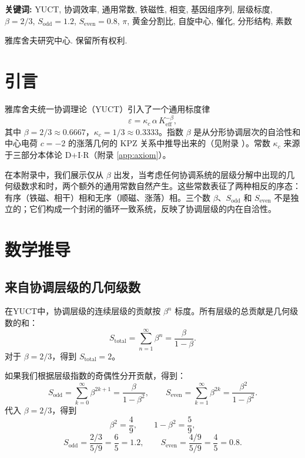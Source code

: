 \documentclass[12pt,a4paper]{article}
\begin{document}
\begin{titlepage}
\begin{center}
			\vspace{1cm}
			\noindent
			\small\textbf{关键词:} YUCT, 协调效率, 通用常数, 铁磁性, 相变, 基因组序列, 层级标度, \(\beta = 2/3\), \(S_{\text{odd}} = 1.2\), \(S_{\text{even}} = 0.8\), \(\pi\), 黄金分割比, 自旋中心, 催化, 分形结构, 素数
			
			\vspace{0.5cm}
			\noindent
			 雅库舍夫研究中心. 保留所有权利.
		\end{center}
	\end{titlepage}
	
	\tableofcontents
	\newpage
	
	\section{引言}
	雅库舍夫统一协调理论（YUCT）引入了一个通用标度律
	\[
	\varepsilon = \kappa_c \, \alpha \, K_{\mathrm{eff}}^{-\beta},
	\]
	其中 \(\beta = 2/3 \approx 0.6667\)，\(\kappa_c = 1/3 \approx 0.3333\)。指数 \(\beta\) 是从分形协调层次的自洽性和中心电荷 \(c = -2\) 的涨落几何的 KPZ 关系中推导出来的（见附录 \cite{AppendixL, AppendixY}）。常数 \(\kappa_c\) 来源于三部分本体论 D+I\(\cdot\)R（附录 \ref{app:axiom}）。
	
	在本附录中，我们展示仅从 \(\beta\) 出发，当考虑任何协调系统的层级分解中出现的几何级数求和时，两个额外的通用常数自然产生。这些常数表征了两种相反的序态：有序（铁磁、相干）相和无序（顺磁、涨落）相。三个数 \(\beta\)、\(S_{\text{odd}}\) 和 \(S_{\text{even}}\) 不是独立的；它们构成一个封闭的循环一致系统，反映了协调层级的内在自洽性。
	
	\section{数学推导}
	
	\subsection{来自协调层级的几何级数}
	在YUCT中，协调层级的连续层级的贡献按 \(\beta^n\) 标度。所有层级的总贡献是几何级数的和：
	\[
	S_{\text{total}} = \sum_{n=1}^{\infty} \beta^n = \frac{\beta}{1-\beta}.
	\]
	对于 \(\beta = 2/3\)，得到 \(S_{\text{total}} = 2\)。
	
	如果我们根据层级指数的奇偶性分开贡献，得到：
	\[
	S_{\text{odd}} = \sum_{k=0}^{\infty} \beta^{2k+1} = \frac{\beta}{1-\beta^2},
	\qquad
	S_{\text{even}} = \sum_{k=1}^{\infty} \beta^{2k} = \frac{\beta^2}{1-\beta^2}.
	\]
	代入 \(\beta = 2/3\)，得到
	\[
	\beta^2 = \frac{4}{9},\qquad 1-\beta^2 = \frac{5}{9},
	\]
	\[
	S_{\text{odd}} = \frac{2/3}{5/9} = \frac{6}{5}=1.2,\qquad
	S_{\text{even}} = \frac{4/9}{5/9} = \frac{4}{5}=0.8.
	\]
	
\end{document}
